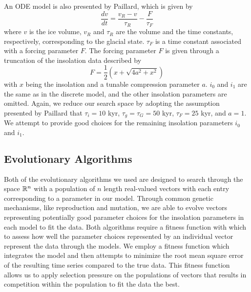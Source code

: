 An ODE model is also presented by Paillard, which is given by \[ \frac{dv}{dt}=\frac{v_{R}-v}{\tau_{R}}-\frac{F}{\tau_{F}} \] where $v$ is the ice volume, $v_{R}$ and $\tau_{R}$ are the volume and the time constants, respectively, corresponding to the glacial state. $\tau_{F}$ is a time constant associated with a forcing parameter $F$. The forcing parameter $F$ is given through a truncation of the insolation data described by \[ F=\frac{1}{2}(x+\sqrt{4a^{2}+x^{2}})\] with $x$ being the insolation and a tunable compression parameter $a$. $i_{0}$ and $i_{1}$ are the same as in the discrete model, and the other insolation parameters are omitted. Again, we reduce our search space by adopting the assumption presented by Paillard that $\tau_{i}=10$ kyr, $\tau_{g}=\tau_{G}=50$ kyr, $\tau_{F}=25$ kyr, and $a=1$. We attempt to provide good choices for the remaining insolation parameters $i_{0}$ and $i_{1}$.\\

\subsection{Evolutionary Algorithms}
Both of the evolutionary algorithms we used are designed to search through the space $\mathbb{R}^{n}$ with a population of $n$ length real-valued vectors with each entry corresponding to a parameter in our model. Through common genetic mechanisms, like reproduction and mutation, we are able to evolve vectors representing potentially good parameter choices for the insolation parameters in each model to fit the \DO  data. Both algorithms require a fitness function with which to assess how well the parameter choices represented by an individual vector represent the \DO data through the models. We employ a fitness function which integrates the model and then attempts to minimize the root mean square error of the resulting time series compared to the true \DO data. This fitness function allows us to apply selection pressure on the populations of vectors that results in competition within the population to fit the \DO data the best.\\
\vspace{.25cm}

